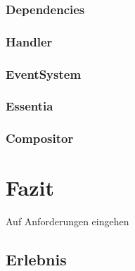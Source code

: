 \documentclass[11pt,a4paper]{article}
\begin{document}
\subsubsection*{Dependencies}

\subsubsection*{Handler}

\subsubsection*{EventSystem}

\subsubsection*{Essentia}

\subsubsection*{Compositor}

\section{Fazit}

Auf Anforderungen eingehen
\subsection{Erlebnis}

\newpage




\listoftables
\listoffigures
\end{document}

